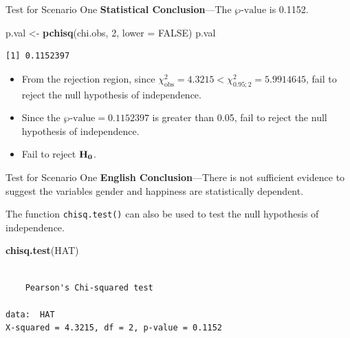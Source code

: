 \documentclass[
  ignorenonframetext,
]{beamer}
\newenvironment{Shaded}{\begin{snugshade}}{\end{snugshade}}
\newcommand{\AttributeTok}[1]{\textcolor[rgb]{0.13,0.29,0.53}{#1}}
\newcommand{\ConstantTok}[1]{\textcolor[rgb]{0.56,0.35,0.01}{#1}}
\newcommand{\DecValTok}[1]{\textcolor[rgb]{0.00,0.00,0.81}{#1}}
\newcommand{\FunctionTok}[1]{\textcolor[rgb]{0.13,0.29,0.53}{\textbf{#1}}}
\newcommand{\NormalTok}[1]{#1}
\newcommand{\OtherTok}[1]{\textcolor[rgb]{0.56,0.35,0.01}{#1}}
\begin{document}
\begin{frame}[fragile]{Test for Scenario One}
\label{test-for-scenario-one-5}
\textbf{Statistical Conclusion}---The \(\wp\text{-value}\) is 0.1152.

\begin{Shaded}
\begin{Highlighting}[]
\NormalTok{p.val }\OtherTok{\textless{}{-}} \FunctionTok{pchisq}\NormalTok{(chi.obs, }\DecValTok{2}\NormalTok{, }\AttributeTok{lower =} \ConstantTok{FALSE}\NormalTok{)}
\NormalTok{p.val}
\end{Highlighting}
\end{Shaded}

\begin{verbatim}
[1] 0.1152397
\end{verbatim}

\begin{itemize}
\item
  From the rejection region, since
  \(\chi_{\text{obs}}^2=4.3215 < \chi^2_{0.95;2}=5.9914645\), fail to
  reject the null hypothesis of independence.
\item
  Since the \(\wp\text{-value}= 0.1152397\) is greater than 0.05, fail
  to reject the null hypothesis of independence.
\item
  Fail to reject \({\bf H_0}\).
\end{itemize}
\end{frame}

\begin{frame}[fragile]{Test for Scenario One}
\label{test-for-scenario-one-6}
\textbf{English Conclusion}---There is not sufficient evidence to
suggest the variables gender and happiness are statistically dependent.

The function \texttt{chisq.test()} can also be used to test the null
hypothesis of independence.

\begin{Shaded}
\begin{Highlighting}[]
\FunctionTok{chisq.test}\NormalTok{(HAT)}
\end{Highlighting}
\end{Shaded}

\begin{verbatim}

    Pearson's Chi-squared test

data:  HAT
X-squared = 4.3215, df = 2, p-value = 0.1152
\end{verbatim}
\end{frame}
\end{document}
